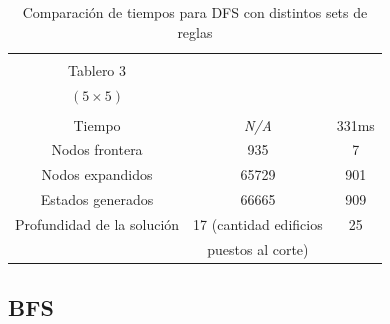 \documentclass[%
    final,
    reprint,
    notitlepage,
    narroweqnarray,
    inline,
    twoside,
    invited
    ]{ieee}
\begin{document}
\begin{table}[H]
\begin{center}
\begin{tabular}{|c|c|c|}
\hline
\hline

&&\\
Tablero 3 & & \\
$(5\times 5)$ & & \\
&&\\
\hline
Tiempo & \textit{N/A} & 331ms \\
\hline
Nodos frontera & 935 & 7 \\
\hline
Nodos expandidos & 65729 & 901 \\
\hline
Estados generados & 66665 & 909 \\
\hline
Profundidad de la solución & 17 (cantidad edificios  & 25 \\
&puestos al corte)&\\

\hline  
\end{tabular}
\end{center}
\caption{Comparación de tiempos para DFS con distintos sets de reglas}\label{tablaIDFS}
\end{table}

\clearpage

\subsection{BFS}
\end{document}

